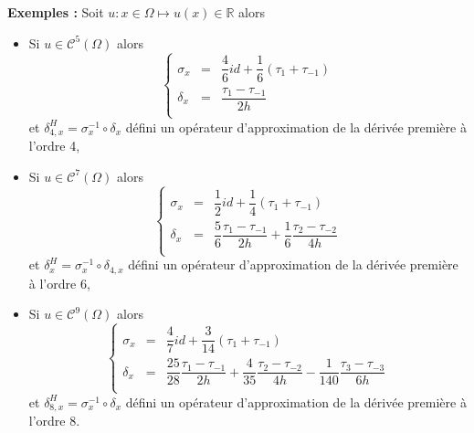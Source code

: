 \textbf{Exemples : }
Soit $u : x \in \Omega \mapsto u(x) \in \mathbb{R}$ alors 
\begin{itemize}
\item Si $u \in \mathcal{C}^{5}(\Omega)$ alors 
\begin{equation}
\left\lbrace
\begin{array}{rcl}
\sigma_{x} &=& \dfrac{4}{6} id + \dfrac{1}{6} \left( \tau_1 + \tau_{-1} \right)\\
\delta_{x} &=& \dfrac{\tau_1 - \tau_{-1}}{2h} \\ 
\end{array}
\right.
\label{eq:comp4}
\end{equation}
et $\delta^H_{4,x} = \sigma_x^{-1} \circ \delta_{x}$ défini un opérateur d'approximation de la dérivée première à l'ordre 4,

\item Si $u \in \mathcal{C}^{7}(\Omega)$ alors 
\begin{equation}
\left\lbrace
\begin{array}{rcl}
\sigma_{x} &=& \dfrac{1}{2} id + \dfrac{1}{4}\left( \tau_1 + \tau_{-1} \right) \\
\delta_{x} &=& \dfrac{5}{6} \dfrac{\tau_1 - \tau_{-1}}{2h} + \dfrac{1}{6} \dfrac{\tau_2 - \tau_{-2}}{4h}\\ 
\end{array}
\right.
\label{eq:comp6}
\end{equation}
et $\delta^H_{x} = \sigma_{x}^{-1} \circ \delta_{4,x}$ défini un opérateur d'approximation de la dérivée première à l'ordre 6,


\item Si $u \in \mathcal{C}^{9}(\Omega)$ alors 
\begin{equation}
\left\lbrace
\begin{array}{rcl}
\sigma_{x} &=& \dfrac{4}{7} id + \dfrac{3}{14}\left( \tau_1 + \tau_{-1} \right) \\
\delta_{x} &=& \dfrac{25}{28} \dfrac{\tau_1 - \tau_{-1}}{2h} + \dfrac{4}{35} \dfrac{\tau_2 - \tau_{-2}}{4h} - \dfrac{1}{140} \dfrac{\tau_3 - \tau_{-3}}{6h} \\ 
\end{array}
\right.
\label{eq:comp8}
\end{equation}
et $\delta^H_{8,x} = \sigma_{x}^{-1} \circ \delta_{x}$ défini un opérateur d'approximation de la dérivée première à l'ordre 8.
\end{itemize}


